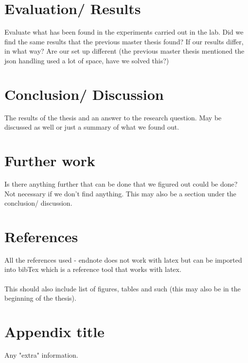 \documentclass[12pt]{report}
\begin{document}
\chapter{Evaluation/ Results}
Evaluate what has been found in the experiments carried out in the lab. Did we find the same results that the previous master thesis found? If our results differ, in what way? Are our set up different (the previous master thesis mentioned the json handling used a lot of space, have we solved this?)

\chapter{Conclusion/ Discussion}
The results of the thesis and an answer to the research question. May be discussed as well or just a summary of what we found out.

\chapter{Further work}
Is there anything further that can be done that we figured out could be done? Not necessary if we don't find anything. This may also be a section under the conclusion/ discussion.

\chapter{References}
All the references used - endnote does not work with latex but can be imported into bibTex which is a reference tool that works with latex.\\
\\
This should also include list of figures, tables and such (this may also be in the beginning of the thesis).

\appendix
\chapter{Appendix title}
Any "extra" information.
\end{document}

